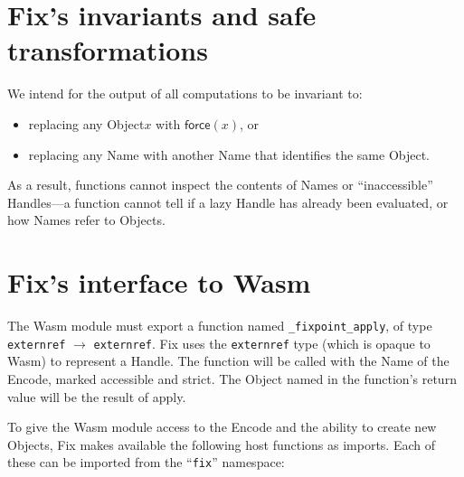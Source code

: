 \documentclass{article}
\newcommand{\object}{\textrm{Object}\xspace}
\newcommand{\objects}{\textrm{Object}s\xspace}
\newcommand{\encode}{\textrm{Encode}\xspace}
\newcommand{\name}{\textrm{Name}\xspace}
\newcommand{\names}{\textrm{Name}s\xspace}
\newcommand{\handle}{\textrm{Handle}\xspace}
\newcommand{\handles}{\textrm{Handle}s\xspace}
\newcommand{\bs}{\vspace{\baselineskip}}
\newcommand{\apply}{\textsf{apply}}
\newcommand{\force}{\textsf{force}}
\begin{document}
\section{Fix's invariants and safe transformations}

We intend for the output of all computations to be invariant to:

\begin{itemize}[itemsep=0pt]

\item replacing any \object $x$ with $\force(x)$, or

\item replacing any \name with another \name that identifies the same \object.

\end{itemize}

As a result, functions cannot inspect the contents of \names or
``inaccessible'' \handles---a function cannot tell if a lazy \handle
has already been evaluated, or how \names refer to \objects.

\section{Fix's interface to Wasm}
\label{s:imports}

The Wasm module must export a function named {\tt \_fixpoint\_apply},
of type \texttt{externref} $\rightarrow$ \texttt{externref}. Fix uses
the \texttt{externref} type (which is opaque to Wasm) to represent a
\handle. The function will be called with the \name of the \encode,
marked accessible and strict. The \object named in the function's
return value will be the result of \apply.

\bs

To give the Wasm module access to the \encode and the ability to
create new \objects, Fix makes available the following host functions
as imports. Each of these can be imported from the ``\texttt{fix}'' namespace:
\end{document}

